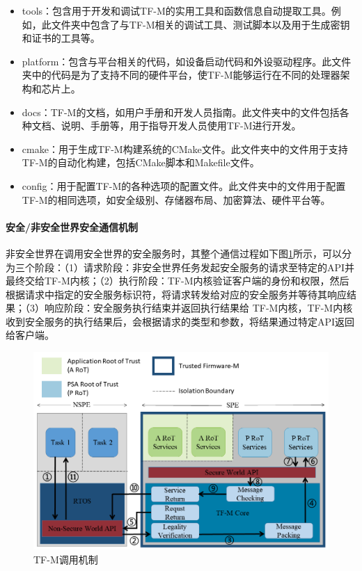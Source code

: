 \documentclass[UTF8,12pt,a4paper,twoside]{ctexart}
\numberwithin{figure}{section}
\begin{document}
\begin{itemize}
    \item tools：包含用于开发和调试TF-M的实用工具和函数信息自动提取工具。例如，此文件夹中包含了与TF-M相关的调试工具、测试脚本以及用于生成密钥和证书的工具等。
    \item platform：包含与平台相关的代码，如设备启动代码和外设驱动程序。此文件夹中的代码是为了支持不同的硬件平台，使TF-M能够运行在不同的处理器架构和芯片上。
    \item docs：TF-M的文档，如用户手册和开发人员指南。此文件夹中的文件包括各种文档、说明、手册等，用于指导开发人员使用TF-M进行开发。
    \item cmake：用于生成TF-M构建系统的CMake文件。此文件夹中的文件用于支持TF-M的自动化构建，包括CMake脚本和Makefile文件。
    \item config：用于配置TF-M的各种选项的配置文件。此文件夹中的文件用于配置TF-M的相同选项，如安全级别、存储器布局、加密算法、硬件平台等。
\end{itemize}

\paragraph{安全/非安全世界安全通信机制}
非安全世界在调用安全世界的安全服务时，其整个通信过程如下图\ref{TF-M Secure communication processes}所示，可以分为三个阶段：（1）请求阶段：非安全世界任务发起安全服务的请求至特定的API并最终交给TF-M内核；（2）执行阶段：TF-M内核验证客户端的身份和权限，然后根据请求中指定的安全服务标识符，将请求转发给对应的安全服务并等待其响应结果；（3）响应阶段：安全服务执行结束并返回执行结果给 TF-M内核，TF-M内核收到安全服务的执行结果后，会根据请求的类型和参数，将结果通过特定API返回给客户端。
\begin{figure}
    \centering
    \includegraphics[scale=0.38]{graph/TF-M Secure communication process.png}
    \caption{TF-M调用机制}
    \label{TF-M Secure communication processes}
\end{figure}
\end{document}
